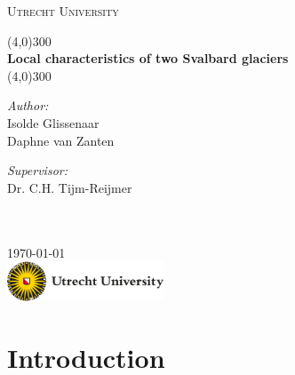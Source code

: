 \documentclass[11pt]{report}
\begin{document}
\begin{titlepage}
	\begin{center}
	\vspace*{0\textheight}
	{\scshape\LARGE Utrecht University \par}
	\vspace{1cm} 
	\line(4,0){300}
	\vspace{0.5cm} \\
	{\Large \bfseries Local characteristics of two Svalbard glaciers\\}
	\vspace{0.5cm}
	\line(4,0){300} \\

	\vspace{2.5cm}
	\begin{minipage}[t]{0.4\textwidth}
	\begin{flushleft} \large
	\emph{Author:}\\
	{Isolde Glissenaar}\\
	{Daphne van Zanten} \\
	\end{flushleft}
	\end{minipage} %
	\begin{minipage}[t]{0.4\textwidth}
	\begin{flushright} \large
	\emph{Supervisor:} \\
	{Dr. C.H. Tijm-Reijmer}\\
	\end{flushright}
	\end{minipage}\\[0.4cm]

	\vspace{3.5cm}
	\large \textit{}\\[1cm]

	{\large {\today}\\[2cm] %

	\noindent
	\includegraphics[scale=1, width=0.35\textwidth]{UU-logo.jpg}}
	\end{center}
\end{titlepage}

\newpage
\tableofcontents

\chapter{Introduction}\label{sec:intro}
\setcounter{page}{2}
\end{document}

